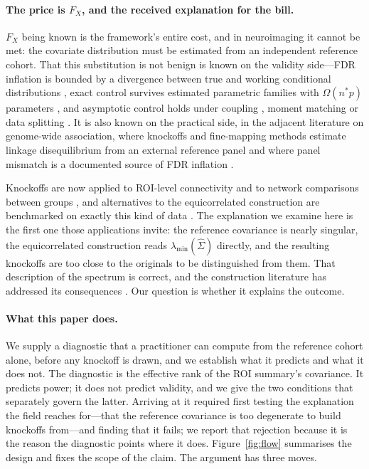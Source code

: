 \documentclass[11pt,a4paper]{article}
\newcommand{\ld}{\lambda_{\min}}
\begin{document}
\paragraph{The price is $F_X$, and the received explanation for the bill.}
$F_X$ being known is the framework's entire cost, and in neuroimaging it
cannot be met: the covariate distribution must be estimated from an
independent reference cohort. That this substitution is not benign is known
on the validity side---FDR inflation is bounded by a divergence between true
and working conditional distributions \citep{barber2020robust}, exact control
survives estimated parametric families with $\Omega(n^*p)$ parameters
\citep{huang2020relaxing}, and asymptotic control holds under coupling
\citep{ark2025}, moment matching \citep{fan2026moments} or data splitting
\citep{fan2020rank}. It is also known on the practical side, in the adjacent
literature on genome-wide association, where knockoffs and fine-mapping
methods estimate linkage disequilibrium from an external reference panel and
where panel mismatch is a documented source of FDR inflation
\citep{benner2017finemap,chen2021ldref,kanai2022slalom}.

Knockoffs are now applied to ROI-level connectivity and to network
comparisons between groups \citep{ji2024differential}, and alternatives to
the equicorrelated construction are benchmarked on exactly this kind of data
\citep{chen2023systematic}. The explanation we examine here is the first one
those applications invite: the reference covariance is nearly singular, the
equicorrelated construction reads $\ld(\hat\Sigma)$ directly, and the
resulting knockoffs are too close to the originals to be distinguished from
them. That description of the spectrum is correct, and the construction
literature has addressed its consequences
\citep{spector2022powerful,candes2018panning}. Our question is whether it
explains the outcome.

\paragraph{What this paper does.}
We supply a diagnostic that a practitioner can compute from the reference
cohort alone, before any knockoff is drawn, and we establish what it predicts
and what it does not. The diagnostic is the effective rank of the ROI
summary's covariance. It predicts power; it does not predict validity, and we
give the two conditions that separately govern the latter. Arriving at it
required first testing the explanation the field reaches for---that the
reference covariance is too degenerate to build knockoffs from---and finding
that it fails; we report that rejection because it is the reason the
diagnostic points where it does. Figure~\ref{fig:flow} summarises the design
and fixes the scope of the claim. The argument has three moves.
\end{document}
